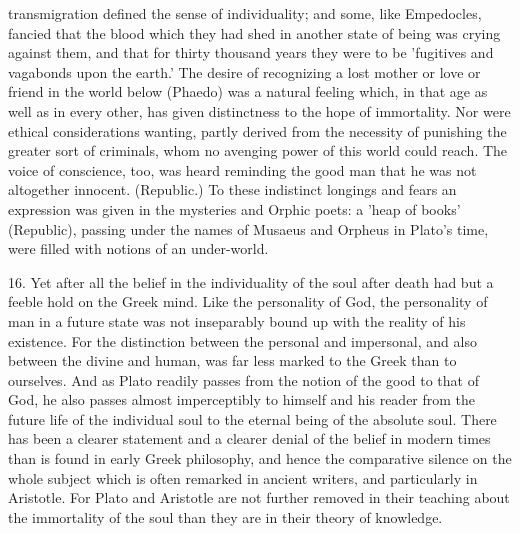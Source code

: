 transmigration defined the sense of individuality; and some, like
Empedocles, fancied that the blood which they had shed in another state of
being was crying against them, and that for thirty thousand years they
were to be 'fugitives and vagabonds upon the earth.' The desire of
recognizing a lost mother or love or friend in the world below (Phaedo)
was a natural feeling which, in that age as well as in every other, has
given distinctness to the hope of immortality. Nor were ethical
considerations wanting, partly derived from the necessity of punishing the
greater sort of criminals, whom no avenging power of this world could
reach. The voice of conscience, too, was heard reminding the good man that
he was not altogether innocent. (Republic.) To these indistinct longings
and fears an expression was given in the mysteries and Orphic poets: a
'heap of books' (Republic), passing under the names of Musaeus and Orpheus
in Plato's time, were filled with notions of an under-world.

16. Yet after all the belief in the individuality of the soul after death
had but a feeble hold on the Greek mind. Like the personality of God, the
personality of man in a future state was not inseparably bound up with the
reality of his existence. For the distinction between the personal and
impersonal, and also between the divine and human, was far less marked to
the Greek than to ourselves. And as Plato readily passes from the notion
of the good to that of God, he also passes almost imperceptibly to himself
and his reader from the future life of the individual soul to the eternal
being of the absolute soul. There has been a clearer statement and a
clearer denial of the belief in modern times than is found in early Greek
philosophy, and hence the comparative silence on the whole subject which
is often remarked in ancient writers, and particularly in Aristotle. For
Plato and Aristotle are not further removed in their teaching about the
immortality of the soul than they are in their theory of knowledge.

